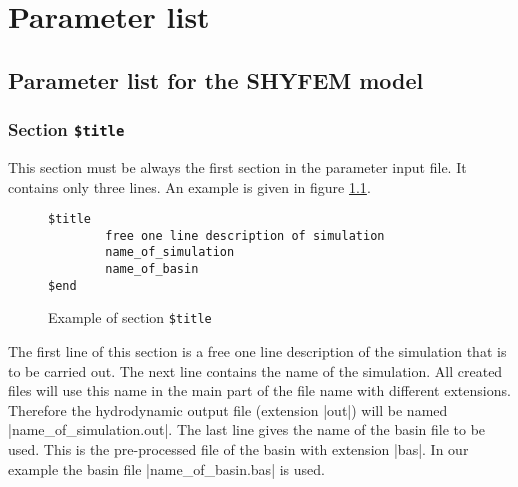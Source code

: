 \documentclass{report}
\begin{document}


%





\chapter{Parameter list}


\section{Parameter list for the SHYFEM model}


\subsection{Section {\tt \$title}}

This section must be always the first section in the parameter input file.
It contains only three lines. An example is given in 
figure \ref{fig:titleexample}.

\begin{figure}[ht]
\begin{verbatim}
$title
        free one line description of simulation
        name_of_simulation
        name_of_basin
$end
\end{verbatim}
\caption{Example of section {\tt \$title}}
\label{fig:titleexample}
\end{figure}

The first line of this section is a free one line description of
the simulation that is to be carried out. The next line contains
the name of the simulation.
All created files will use this name in the main part of the file name
with different extensions. Therefore the hydrodynamic output file
(extension |out|) will be named |name_of_simulation.out|.
The last line gives the name of the basin file to be used. This
is the pre-processed file of the basin with extension |bas|.
In our example the basin file |name_of_basin.bas| is used.
\end{document}
